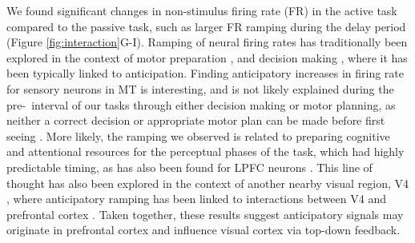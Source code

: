 We found significant changes in non-stimulus firing rate (FR) in the active task compared to the passive task, such as larger FR ramping during the delay period (Figure \ref{fig:interaction}G-I). Ramping of neural firing rates has traditionally been explored in the context of motor preparation \parencite{Ding2015, Narayanan2016}, and decision making \parencite{Shadlen2001}, where it has been typically linked to anticipation. Finding anticipatory increases in firing rate for sensory neurons in MT is interesting, and is not likely explained during the pre-\test\ interval of our tasks through either decision making or motor planning, as neither a correct decision or appropriate motor plan can be made before first seeing \test . 
More likely, the ramping we observed is related to preparing cognitive and attentional resources for the perceptual phases of the task, which had highly predictable timing, as has also been found for LPFC neurons \parencite{Hussar2010, Bisley2004}. This line of thought has also been explored in the context of another nearby visual region, V4 \parencite{Snyder2018,Luck1997}, where anticipatory ramping has been linked to interactions between V4 and prefrontal cortex \parencite{Snyder2021}. 
Taken together, these results suggest anticipatory signals may originate in prefrontal cortex and influence visual cortex via top-down feedback.


